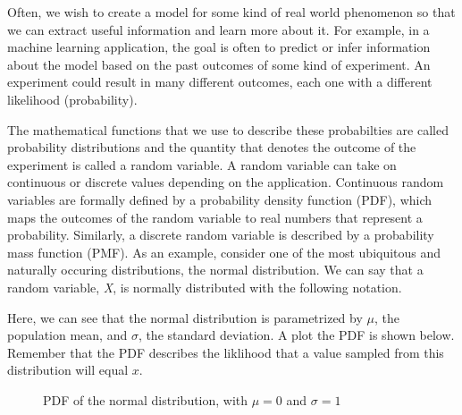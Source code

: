 \documentclass[11pt]{article}
\begin{document}
\begin{justify}

Often, we wish to create a model for some kind of real world phenomenon so that we can extract useful information and learn more about it. For example, in a machine learning application, the goal is often to predict or infer information about the model based on the past outcomes of some kind of experiment. An experiment could result in many different outcomes, each one with a different likelihood (probability).

The mathematical functions that we use to describe these probabilties are called probability distributions and the quantity that denotes the outcome of the experiment is called a random variable. A random variable can take on continuous or discrete values depending on the application. Continuous random variables are formally defined by a probability density function (PDF), which maps the outcomes of the random variable to real numbers that represent a probability. Similarly, a discrete random variable is described by a probability mass function (PMF). As an example, consider one of the most ubiquitous and naturally occuring distributions, the normal distribution. We can say that a random variable, \textit{X}, is normally distributed with the following notation.

\begin{center}
\end{center}

Here, we can see that the normal distribution is parametrized by $\mu$, the population mean, and $\sigma$, the standard deviation. A plot the PDF is shown below. Remember that the PDF describes the liklihood that a value sampled from this distribution will equal $x$.

\begin{figure}[h]
\centering
{}
\caption{PDF of the normal distribution, with $\mu = 0$ and $\sigma = 1$}
\end{figure}


\end{justify}
\end{document}
